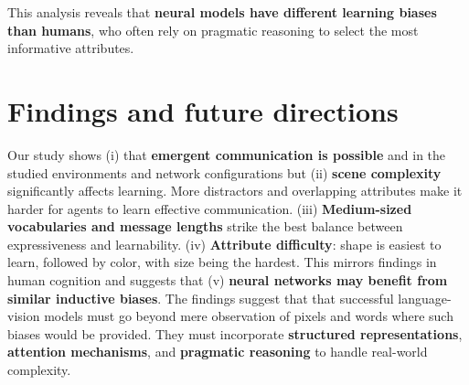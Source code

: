 \documentclass[11pt]{article}
\def\tightlist{} %
\begin{document}
This analysis reveals that \textbf{neural models have different learning
biases than humans}, who often rely on pragmatic reasoning to select the
most informative attributes.

\section{Findings and future directions}

Our study shows (i) that \textbf{emergent communication is possible}
and in the studied environments and network configurations but (ii)
\textbf{scene complexity} significantly affects learning. More
distractors and overlapping attributes make it harder for agents to
learn effective communication. (iii) \textbf{Medium-sized vocabularies
  and message lengths} strike the best balance between expressiveness
and learnability.
(iv) \textbf{Attribute difficulty}: shape is easiest to learn,
followed by color, with size being the hardest. This mirrors findings
in human cognition and suggests that (v) \textbf{neural networks may
  benefit from similar inductive biases}. The findings suggest that
that successful language-vision models must go beyond mere observation
of pixels and words where such biases would be provided. They must
incorporate \textbf{structured representations}, \textbf{attention
  mechanisms}, and \textbf{pragmatic reasoning} to handle real-world
complexity.






%




\end{document}
